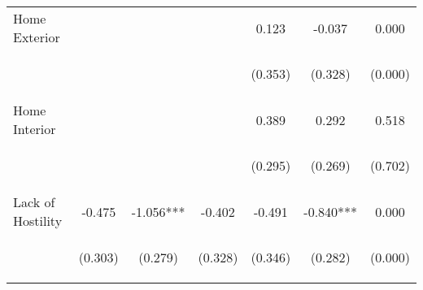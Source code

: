 \begin{tabular}{lcccccc}
\noalign{\smallskip}Home Exterior &  &  &  & 0.123 & -0.037 & 0.000\\
 & \begin{footnotesize}\end{footnotesize} & \begin{footnotesize}\end{footnotesize} & \begin{footnotesize}\end{footnotesize} & \begin{footnotesize}(0.353)\end{footnotesize} & \begin{footnotesize}(0.328)\end{footnotesize} & \begin{footnotesize}(0.000)\end{footnotesize}\\
\noalign{\smallskip}Home Interior &  &  &  & 0.389 & 0.292 & 0.518\\
 & \begin{footnotesize}\end{footnotesize} & \begin{footnotesize}\end{footnotesize} & \begin{footnotesize}\end{footnotesize} & \begin{footnotesize}(0.295)\end{footnotesize} & \begin{footnotesize}(0.269)\end{footnotesize} & \begin{footnotesize}(0.702)\end{footnotesize}\\
\noalign{\smallskip}Lack of Hostility & -0.475 & -1.056*** & -0.402 & -0.491 & -0.840*** & 0.000\\
 & \begin{footnotesize}(0.303)\end{footnotesize} & \begin{footnotesize}(0.279)\end{footnotesize} & \begin{footnotesize}(0.328)\end{footnotesize} & \begin{footnotesize}(0.346)\end{footnotesize} & \begin{footnotesize}(0.282)\end{footnotesize} & \begin{footnotesize}(0.000)\end{footnotesize}\\

\end{tabular}
